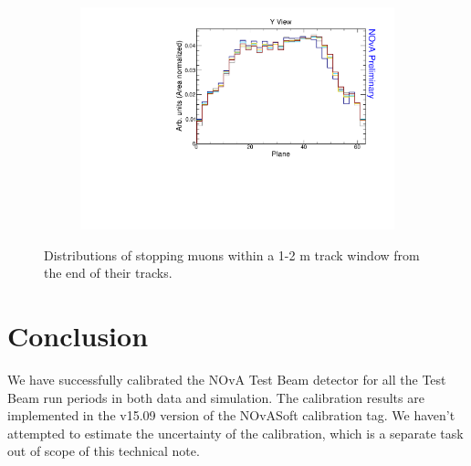\begin{figure}[ht!]
\begin{subfigure}{0.495\textwidth}
  \end{subfigure}
  \begin{subfigure}{0.495\textwidth}
    \includegraphics[width=\linewidth]{essentialsec_tb/nhits_plane_y.pdf}
  \end{subfigure}
    \caption{Distributions of stopping muons within a 1-2 m track window from the end of their tracks.}
  \label{fig:AbsCalibNHitsWCellPlane}
\end{figure}


\section{Conclusion}
We have successfully calibrated the NOvA Test Beam detector for all the Test Beam run periods in both data and simulation. The calibration results are implemented in the v15.09 version of the NOvASoft calibration tag. We haven't attempted to estimate the uncertainty of the calibration, which is a separate task out of scope of this technical note.